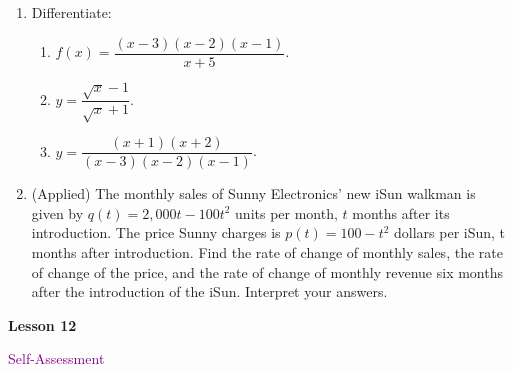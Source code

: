 \documentclass[10pt]{book}
\theoremstyle{definition}
\theoremstyle{remark}
\begin{document}
\begin{large}
\begin{enumerate}
\item Differentiate: 
\begin{enumerate} 
\item $f\left(x\right) = \dfrac{\left(x-3\right)\left(x-2\right)\left(x-1\right)}{x+5}$.\vfil
\item $y =\dfrac{\sqrt{x}-1}{\sqrt{x} + 1}$.\vfil
\item $y = \dfrac{\left(x+1\right)\left(x+2\right)}{\left(x-3\right)\left(x-2\right)\left(x-1\right)}$.\vfil
\end{enumerate}
\newpage

\item (Applied) The monthly sales of Sunny Electronics’ new iSun walkman is given by $q(t) = 2,000t - 100t^2$ units per month, $t$ months after its introduction. The price Sunny charges is $p(t) = 100 - t^2$ dollars per iSun, t months after introduction.  Find the rate of change of monthly sales, the rate of change of the price, and the rate of change of monthly revenue six months after the introduction of the iSun. Interpret your answers. 
\end{enumerate}
\end{large}
\newpage


\begin{tcolorbox}[
  width=\textwidth,
  colback=gray!10, %
  colframe=white, %
  boxrule=0pt,    %
  left=1cm,       %
  right=1cm,      %
  sharp corners  %
]

\begin{minipage}[t]{0.5\textwidth}
  \Huge \textbf{Lesson 12}
\end{minipage}%
\hfill
\begin{minipage}[t]{0.5\textwidth}
  \Huge\textcolor{purple}{Self-Assessment}
\end{minipage}
\end{tcolorbox}
\end{document}
